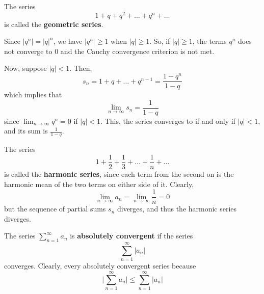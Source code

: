   \begin{example}
    The series 
    \begin{equation}
      1 + q + q^2 + \ldots + q^n + \ldots
    \end{equation}
    is called the \textbf{geometric series}. 

    Since $|q^n| = |q|^n$, we have $|q^n| \geq 1$ when $|q| \geq 1$. So, if $|q| \geq 1$, the terms $q^n$ does not converge to $0$ and the Cauchy convergence criterion is not met. 

    Now, suppose $|q|<1$. Then, 
    \begin{equation}
      s_n = 1 + q + \ldots + q^{n-1} = \frac{1 - q^n}{1-q}
    \end{equation}
    which implies that
    \begin{equation}
      \lim_{n\rightarrow \infty} s_n = \frac{1}{1-q}
    \end{equation}
    since $\lim_{n\rightarrow \infty} q^n = 0$ if $|q|<1$. This, the series converges to if and only if $|q|<1$, and its sum is $\frac{1}{1-q}$. 
  \end{example}

  \begin{example}
    The series 
    \begin{equation}
      1 + \frac{1}{2} + \frac{1}{3} + \ldots + \frac{1}{n} + \ldots
    \end{equation}
    is called the \textbf{harmonic series}, since each term from the second on is the harmonic mean of the two terms on either side of it. Clearly, 
    \begin{equation}
      \lim_{n \rightarrow \infty} a_n = \lim_{n \rightarrow \infty} \frac{1}{n} = 0
    \end{equation}
    but the sequence of partial sums $s_n$ diverges, and thus the harmonic series diverges. 
  \end{example}

  \begin{definition}
    The series $\sum_{n=1}^\infty a_n$ is \textbf{absolutely convergent} if the series 
    \begin{equation}
      \sum_{n=1}^\infty |a_n|
    \end{equation}
    converges. Clearly, every absolutely convergent series because 
    \begin{equation}
      \bigg|\sum_{n=1}^\infty a_n \bigg| \leq \sum_{n=1}^\infty |a_n|
    \end{equation}
  \end{definition}

